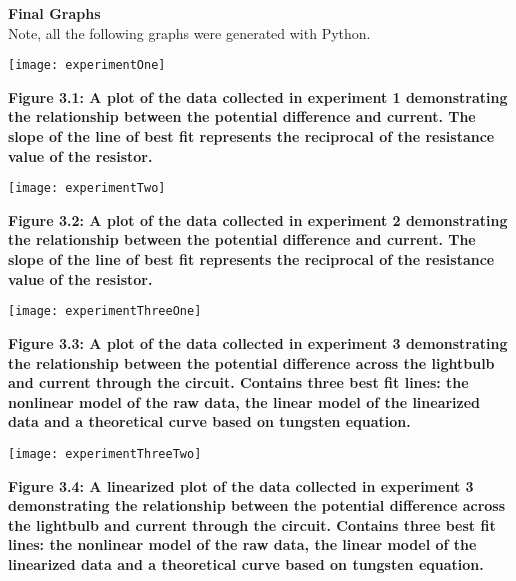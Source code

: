 \documentclass[
	letterpaper, %
	10pt, %
]{CSUniSchoolLabReport}
\begin{document}
{\large\textbf{Final Graphs}}
{\vspace{5pt}}\\
Note, all the following graphs were generated with Python.\\
\begin{center}
	\texttt{[image: experimentOne]}
\end{center}
\begin{center}
    \textbf{Figure 3.1: A plot of the data collected in experiment 1 demonstrating the relationship between the potential difference and current. The slope of the line of best fit represents the reciprocal of the resistance value of the resistor.}\\
\end{center}
\begin{center}
	\texttt{[image: experimentTwo]}
\end{center}
\begin{center}
    \textbf{Figure 3.2: A plot of the data collected in experiment 2 demonstrating the relationship between the potential difference and current. The slope of the line of best fit represents the reciprocal of the resistance value of the resistor.}\\
\end{center}
\begin{center}
	\texttt{[image: experimentThreeOne]}
\end{center}
\begin{center}
    \textbf{Figure 3.3: A plot of the data collected in experiment 3 demonstrating the relationship between the potential difference across the lightbulb and current through the circuit. Contains three best fit lines: the nonlinear model of the raw data, the linear model of the linearized data and a theoretical curve based on tungsten equation.}\\
\end{center}
\begin{center}
	\texttt{[image: experimentThreeTwo]}
\end{center}
\begin{center}
    \textbf{Figure 3.4: A linearized plot of the data collected in experiment 3 demonstrating the relationship between the potential difference across the lightbulb and current through the circuit. Contains three best fit lines: the nonlinear model of the raw data, the linear model of the linearized data and a theoretical curve based on tungsten equation.}\\
\end{center}
\newpage
\end{document}
